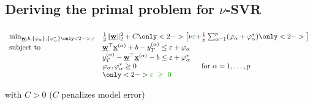 \subsection{Deriving the primal problem for $\nu$-SVR}

\begin{frame}\frametitle{\subsecname}

\slidesonly{\vspace{-4mm}}

\begin{block}{}
     \begin{equation}
        \begin{array}{ll}
        \min_{\vec w, b,\{\varphi_\alpha\}, \{\varphi_\alpha^*\}\only<2->{, {\color{darkgreen}{\varepsilon}}}} & \frac{1}{2} \lVert \vec w \rVert_{2}^{2} + C \only<2->{\big\lbrack \nu{\color{darkgreen}\varepsilon} + } \frac{1}{p} \sum_{\alpha=1}^p (\varphi_\alpha + \varphi_\alpha^*) \only<2->{\big\rbrack}\\
        \text{subject to} & 
        \vec w^{\top} \vec x^{(\alpha)} + b - y_{T}^{(\alpha)} \le \varepsilon + \varphi_\alpha\\
        &
        y_{T}^{(\alpha)} - \vec w^{\top} \vec x^{(\alpha)} - b \le \varepsilon + \varphi_\alpha^*\\
        &\varphi_\alpha, \varphi_\alpha^* \ge 0  \qquad\qquad\qquad\qquad\quad \text{for }\alpha=1,\ldots,p \\
        &\only<2->{{\color{darkgreen}\varepsilon~\ge~0}}
        \end{array}
        \label{eq:primalnu}
     \end{equation}
     
     \svspace{-3mm}
        with $C>0$ ($C$ penalizes model error)
\end{block}

\pause


     \svspace{-3mm}

     \\
     
\pause


\end{frame}
